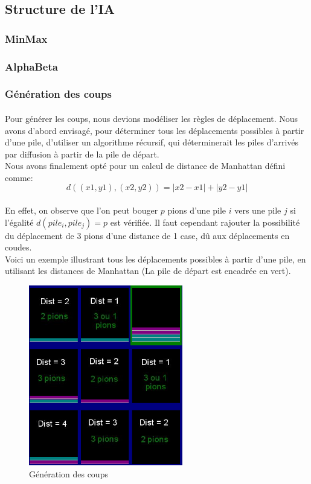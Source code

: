 \documentclass[article, backcover, french, nodocumentinfo]{upmethodology-document}
\begin{document}
		\subsection{Structure de l'IA}
			\subsubsection{MinMax}
			\subsubsection{AlphaBeta}
			\subsubsection{Génération des coups}
				\paragraph{}
					Pour générer les coups, nous devions modéliser les règles de déplacement. Nous avons d'abord envisagé, pour déterminer tous les déplacements possibles à partir d'une pile, d'utiliser un algorithme récursif, qui déterminerait les piles d'arrivés par diffusion à partir de la pile de départ.\\
					Nous avons finalement opté pour un calcul de distance de Manhattan défini comme:
					\[d((x1,y1),(x2,y2)) = |x2 - x1| + |y2 -y1|\]
				\paragraph{}
					En effet, on observe que l'on peut bouger $p$ pions d'une pile $i$ vers une pile $j$ si l'égalité $d(pile_{i}, pile_{j}) = p$ est vérifiée. Il faut cependant rajouter la possibilité du déplacement de 3 pions d'une distance de 1 case, dû aux déplacements en coudes.\\
					Voici un exemple illustrant tous les déplacements possibles à partir d'une pile, en utilisant les distances de Manhattan (La pile de départ est encadrée en vert).
					\begin{figure}[H]
						\centering
						\includegraphics[width=0.6\textwidth]{figures/GenerationCoup}
						\caption{Génération des coups}
					\end{figure}
\end{document}
